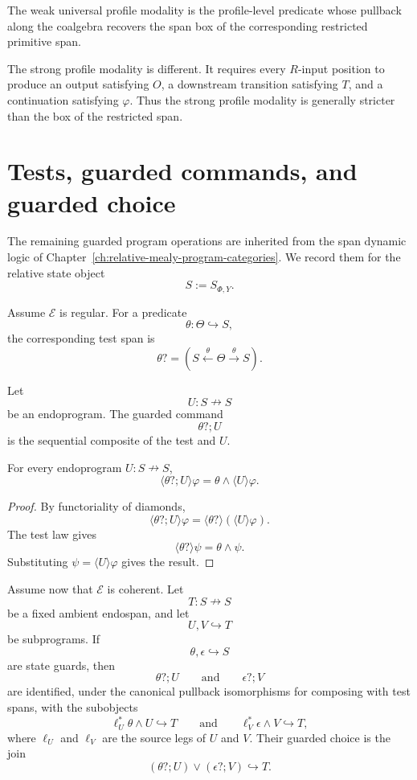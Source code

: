 \begin{remark}
\label{rem:poly-relative-profile-versus-span-boxes}
The weak universal profile modality is the profile-level predicate whose
pullback along the coalgebra recovers the span box of the corresponding
restricted primitive span.

The strong profile modality is different.  It requires every \(R\)-input
position to produce an output satisfying \(O\), a downstream transition
satisfying \(T\), and a continuation satisfying \(\varphi\).  Thus the strong
profile modality is generally stricter than the box of the restricted span.
\end{remark}

\section{Tests, guarded commands, and guarded choice}
\label{sec:poly-relative-tests-guarded-choice}

The remaining guarded program operations are inherited from the span dynamic
logic of Chapter~\ref{ch:relative-mealy-program-categories}.  We record them
for the relative state object
\[
S:=S_{\Phi,Y}.
\]

Assume \(\mathcal E\) is regular.  For a predicate
\[
\theta:\Theta\hookrightarrow S,
\]
the corresponding test span is
\[
\theta?
=
\left(
S\xleftarrow{\theta}\Theta\xrightarrow{\theta}S
\right).
\]

Let
\[
U:S\nrightarrow S
\]
be an endoprogram.  The guarded command
\[
\theta?;U
\]
is the sequential composite of the test and \(U\).

\begin{proposition}
\label{prop:poly-relative-guard-prefix-law}
For every endoprogram \(U:S\nrightarrow S\),
\[
\langle \theta?;U\rangle\varphi
=
\theta\wedge\langle U\rangle\varphi.
\]
\end{proposition}

\begin{proof}
By functoriality of diamonds,
\[
\langle \theta?;U\rangle\varphi
=
\langle \theta?\rangle(\langle U\rangle\varphi).
\]
The test law gives
\[
\langle \theta?\rangle\psi=\theta\wedge\psi.
\]
Substituting \(\psi=\langle U\rangle\varphi\) gives the result.
\end{proof}

Assume now that \(\mathcal E\) is coherent.  Let
\[
T:S\nrightarrow S
\]
be a fixed ambient endospan, and let
\[
U,V\hookrightarrow T
\]
be subprograms.  If
\[
\theta,\epsilon\hookrightarrow S
\]
are state guards, then
\[
\theta?;U
\qquad
\text{and}
\qquad
\epsilon?;V
\]
are identified, under the canonical pullback isomorphisms for composing with
test spans, with the subobjects
\[
\ell_U^\ast\theta\wedge U\hookrightarrow T
\qquad
\text{and}
\qquad
\ell_V^\ast\epsilon\wedge V\hookrightarrow T,
\]
where \(\ell_U\) and \(\ell_V\) are the source legs of \(U\) and \(V\).  Their
guarded choice is the join
\[
(\theta?;U)\vee(\epsilon?;V)\hookrightarrow T.
\]


